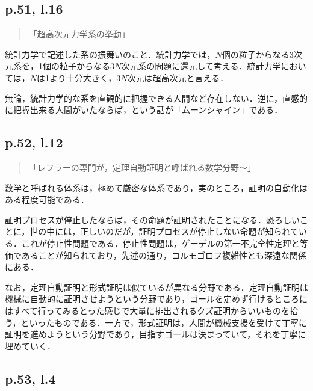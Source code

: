 \documentclass[10pt, a5paper, twoside]{jsarticle}
\theoremstyle{definition}
\begin{document}
            \subsection{p.51, l.16}

                \begin{quote}

                    「超高次元力学系の挙動」

                \end{quote}

                統計力学で記述した系の振舞いのこと．統計力学では，$N$個の粒子からなる3次元系を，1個の粒子からなる$3N$次元系の問題に還元して考える．統計力学においては，$N$は1より十分大きく，$3N$次元は超高次元と言える．

                無論，統計力学的な系を直観的に把握できる人間など存在しない．逆に，直感的に把握出来る人間がいたならば，という話が「ムーンシャイン」である．

            \subsection{p.52, l.12}

                \begin{quote}

                    「レフラーの専門が，定理自動証明と呼ばれる数学分野〜」

                \end{quote}

                数学と呼ばれる体系は，極めて厳密な体系であり，実のところ，証明の自動化はある程度可能である．

                証明プロセスが停止したならば，その命題が証明されたことになる．恐ろしいことに，世の中には，正しいのだが，証明プロセスが停止しない命題が知られている．これが停止性問題である．停止性問題は，ゲーデルの第一不完全性定理と等価であることが知られており，先述の通り，コルモゴロフ複雑性とも深遠な関係にある．

                なお，定理自動証明と形式証明は似ているが異なる分野である．定理自動証明は機械に自動的に証明させようという分野であり，ゴールを定めず行けるところにはすべて行ってみるとった感じで大量に排出されるクズ証明からいいものを拾う，といったものである．一方で，形式証明は，人間が機械支援を受けて丁寧に証明を進めようという分野であり，目指すゴールは決まっていて，それを丁寧に埋めていく．

            \subsection{p.53, l.4}
\end{document}
